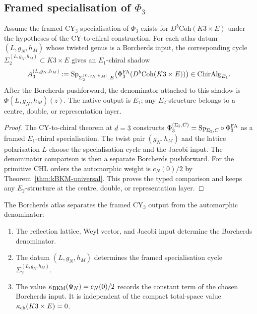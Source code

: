 \subsection{Framed specialisation of $\Phi_3$}
\label{subsec:two-stage-agreement}

\begin{proposition}
\label{prop:atlas-stage-2}
Assume the framed CY$_3$ specialisation of $\Phi_3$ exists for
$D^b\mathrm{Coh}(K3\times E)$ under the hypotheses of the
CY-to-chiral construction. For each atlas datum $(L,g_N,h_M)$ whose
twisted genus is a Borcherds input, the corresponding cycle
$\Sigma_2^{(L,g_N,h_M)}\subset K3\times E$ gives an $E_1$-chiral
shadow
\[
  A_3^{(L,g_N,h_M)}
  :=
  \mathrm{Sp}_{\Sigma_2^{(L,g_N,h_M)},E}
  \bigl(\Phi^{\mathrm{FA}}_3(D^b\mathrm{Coh}(K3\times E))\bigr)
  \in \mathrm{ChirAlg}_{E_1}.
\]
After the Borcherds pushforward, the denominator attached to this
shadow is $\Phi(L,g_N,h_M)(z)$. The native output is $E_1$; any
$E_2$-structure belongs to a centre, double, or representation layer.
\end{proposition}
\begin{proof}
The CY-to-chiral theorem at $d=3$ constructs
$\Phi_3^{(\Sigma_2,C)}=\mathrm{Sp}_{\Sigma_2,C}\circ\Phi^{\mathrm{FA}}_3$ as a framed
$E_1$-chiral specialisation. The twist pair $(g_N,h_M)$ and the lattice
polarisation $L$ choose the specialisation cycle and the Jacobi input.
The denominator comparison is then a separate Borcherds pushforward.
For the primitive CHL orders the automorphic weight is $c_N(0)/2$ by
Theorem~\ref{thm:kBKM-universal}. This proves the typed comparison and
keeps any $E_2$-structure at the centre, double, or representation
layer.
\end{proof}

\begin{corollary}
\label{cor:native-output-automorphic-specialisation}
The Borcherds atlas separates the framed CY$_3$ output from the
automorphic denominator:
\begin{enumerate}
\item The reflection lattice, Weyl vector, and Jacobi input determine
the Borcherds denominator.
\item The datum $(L,g_N,h_M)$ determines the framed specialisation
cycle $\Sigma_2^{(L,g_N,h_M)}$.
\item The value $\kappa_{\mathrm{BKM}}(\Phi_N)=c_N(0)/2$ records the constant term of
the chosen Borcherds input. It is independent of the compact
total-space value $\kappa_{\mathrm{ch}}(K3\times E)=0$.
\end{enumerate}
\end{corollary}


